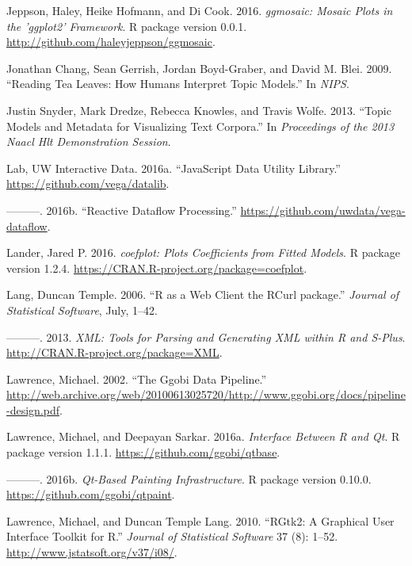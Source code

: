 \documentclass[12pt,]{isuthesis}
\begin{document}
\hypertarget{ref-ggmosaic}{}
Jeppson, Haley, Heike Hofmann, and Di Cook. 2016. \emph{ggmosaic: Mosaic
Plots in the 'ggplot2' Framework}. R package version 0.0.1.
\url{http://github.com/haleyjeppson/ggmosaic}.

\hypertarget{ref-Chang}{}
Jonathan Chang, Sean Gerrish, Jordan Boyd-Graber, and David M. Blei.
2009. ``Reading Tea Leaves: How Humans Interpret Topic Models.'' In
\emph{NIPS}.

\hypertarget{ref-Snyder}{}
Justin Snyder, Mark Dredze, Rebecca Knowles, and Travis Wolfe. 2013.
``Topic Models and Metadata for Visualizing Text Corpora.'' In
\emph{Proceedings of the 2013 Naacl Hlt Demonstration Session}.

\hypertarget{ref-datalib}{}
Lab, UW Interactive Data. 2016a. ``JavaScript Data Utility Library.''
\url{https://github.com/vega/datalib}.

\hypertarget{ref-vega-dataflow}{}
---------. 2016b. ``Reactive Dataflow Processing.''
\url{https://github.com/uwdata/vega-dataflow}.

\hypertarget{ref-coefplot}{}
Lander, Jared P. 2016. \emph{coefplot: Plots Coefficients from Fitted
Models}. R package version 1.2.4.
\url{https://CRAN.R-project.org/package=coefplot}.

\hypertarget{ref-Lang:2006us}{}
Lang, Duncan Temple. 2006. ``R as a Web Client the RCurl package.''
\emph{Journal of Statistical Software}, July, 1--42.

\hypertarget{ref-XML}{}
---------. 2013. \emph{XML: Tools for Parsing and Generating XML within
R and S-Plus}. \url{http://CRAN.R-project.org/package=XML}.

\hypertarget{ref-ggobi-pipeline-design}{}
Lawrence, Michael. 2002. ``The Ggobi Data Pipeline.''
\url{http://web.archive.org/web/20100613025720/http://www.ggobi.org/docs/pipeline-design.pdf}.

\hypertarget{ref-qtbase}{}
Lawrence, Michael, and Deepayan Sarkar. 2016a. \emph{Interface Between R
and Qt}. R package version 1.1.1. \url{https://github.com/ggobi/qtbase}.

\hypertarget{ref-qtpaint}{}
---------. 2016b. \emph{Qt-Based Painting Infrastructure}. R package
version 0.10.0. \url{https://github.com/ggobi/qtpaint}.

\hypertarget{ref-RGtk2}{}
Lawrence, Michael, and Duncan Temple Lang. 2010. ``RGtk2: A Graphical
User Interface Toolkit for R.'' \emph{Journal of Statistical Software}
37 (8): 1--52. \url{http://www.jstatsoft.org/v37/i08/}.
\end{document}
